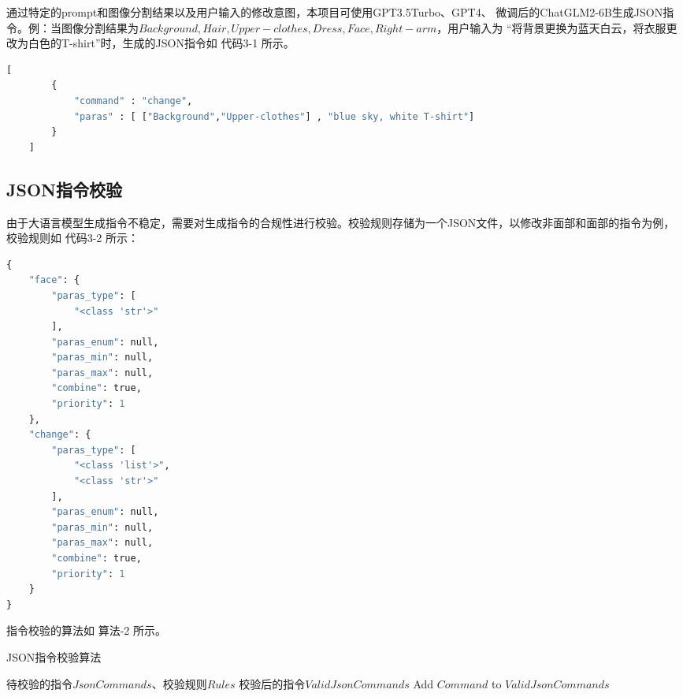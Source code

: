 \documentclass[a4paper,AutoFakeBold,oneside,12pt]{book}
\begin{document}
通过特定的prompt和图像分割结果以及用户输入的修改意图，本项目可使用GPT3.5Turbo、GPT4、
微调后的ChatGLM2-6B生成JSON指令。例：当图像分割结果为$Background, Hair, Upper-clothes, Dress, Face, Right-arm$，用户输入为
“将背景更换为蓝天白云，将衣服更改为白色的T-shirt”时，生成的JSON指令如 代码3-1 所示。

\begin{lstlisting}[language=Python, caption=生成的指令, label=plus, tabsize=2]  
    [
        {
            "command" : "change",
            "paras" : [ ["Background","Upper-clothes"] , "blue sky, white T-shirt"]
        }
    ]
\end{lstlisting} 

\subsection{JSON指令校验}
由于大语言模型生成指令不稳定，需要对生成指令的合规性进行校验。校验规则存储为一个JSON文件，以修改非面部和面部的指令为例，校验规则如 代码3-2 所示：
\begin{lstlisting}[language=Python, caption=指令校验规则, label=plus, tabsize=2]  
    {
    "face": {
        "paras_type": [
            "<class 'str'>"
        ],
        "paras_enum": null,
        "paras_min": null,
        "paras_max": null,
        "combine": true,
        "priority": 1
    },
    "change": {
        "paras_type": [
            "<class 'list'>",
            "<class 'str'>"
        ],
        "paras_enum": null,
        "paras_min": null,
        "paras_max": null,
        "combine": true,
        "priority": 1
    }
}
\end{lstlisting} 
指令校验的算法如 算法-2 所示。
\begin{algorithm} 
	\begin{spacing}{1.3}
		\caption{JSON指令校验算法} 
		\label{JsonCommandCheckAlgorithm}
		\renewcommand{\algorithmicrequire}{\textbf{输入：}}
		\renewcommand{\algorithmicensure}{\textbf{输出：}} 
			\begin{algorithmic}[1] 
				\Require 待校验的指令$JsonCommands$、校验规则$Rules$
				\Ensure 校验后的指令$ValidJsonCommands$
                        \State Add $Command$ to $ValidJsonCommands$
                    \EndIf
                \EndFor
			\end{algorithmic}
	\end{spacing}
\end{algorithm}
\end{document}
